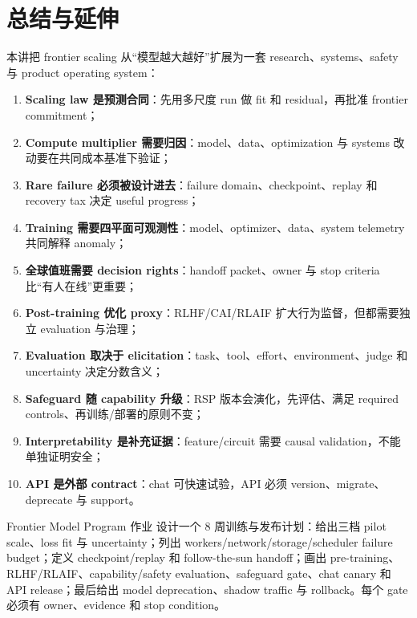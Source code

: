 \documentclass[a4paper]{article}
\begin{document}
\section{总结与延伸}

本讲把 frontier scaling 从“模型越大越好”扩展为一套 research、systems、safety 与 product operating system：

\begin{enumerate}
  \item \textbf{Scaling law 是预测合同}：先用多尺度 run 做 fit 和 residual，再批准 frontier commitment；
  \item \textbf{Compute multiplier 需要归因}：model、data、optimization 与 systems 改动要在共同成本基准下验证；
  \item \textbf{Rare failure 必须被设计进去}：failure domain、checkpoint、replay 和 recovery tax 决定 useful progress；
  \item \textbf{Training 需要四平面可观测性}：model、optimizer、data、system telemetry 共同解释 anomaly；
  \item \textbf{全球值班需要 decision rights}：handoff packet、owner 与 stop criteria 比“有人在线”更重要；
  \item \textbf{Post-training 优化 proxy}：RLHF/CAI/RLAIF 扩大行为监督，但都需要独立 evaluation 与治理；
  \item \textbf{Evaluation 取决于 elicitation}：task、tool、effort、environment、judge 和 uncertainty 决定分数含义；
  \item \textbf{Safeguard 随 capability 升级}：RSP 版本会演化，先评估、满足 required controls、再训练/部署的原则不变；
  \item \textbf{Interpretability 是补充证据}：feature/circuit 需要 causal validation，不能单独证明安全；
  \item \textbf{API 是外部 contract}：chat 可快速试验，API 必须 version、migrate、deprecate 与 support。
\end{enumerate}

\begin{importantbox}{Frontier Model Program 作业}
设计一个 8 周训练与发布计划：给出三档 pilot scale、loss fit 与 uncertainty；列出 workers/network/storage/scheduler failure budget；定义 checkpoint/replay 和 follow-the-sun handoff；画出 pre-training、RLHF/RLAIF、capability/safety evaluation、safeguard gate、chat canary 和 API release；最后给出 model deprecation、shadow traffic 与 rollback。每个 gate 必须有 owner、evidence 和 stop condition。
\end{importantbox}
\end{document}
